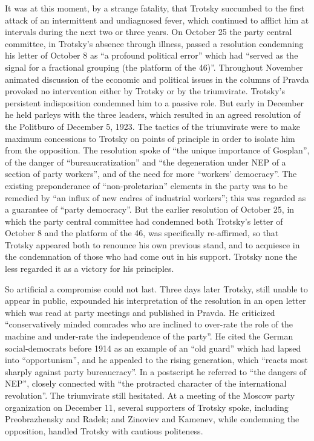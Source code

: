 It was at this moment, by a strange fatality, that Trotsky succumbed to the first attack of an intermittent and undiagnosed fever, which continued to afflict him at intervals during the next two or three years. On October 25 the party central committee, in Trotsky's absence through illness, passed a resolution condemning his letter of October 8 as ``a profound political error'' which had ``served as the signal for a fractional grouping (the platform of the 46)''. Throughout November animated discussion of the economic and political issues in the columns of Pravda provoked no intervention either by Trotsky or by the triumvirate. Trotsky's persistent indisposition condemned him to a passive role. But early in December he held parleys with the three leaders, which resulted in an agreed resolution of the Politburo of December 5, 1923. The tactics of the triumvirate were to make maximum concessions to Trotsky on points of principle in order to isolate him from the opposition. The resolution spoke of ``the unique importance of Gosplan'', of the danger of ``bureaucratization'' and ``the degeneration under NEP of a section of party workers'', and of the need for more ``workers' democracy''. The existing preponderance of ``non-proletarian'' elements in the party was to be remedied by ``an influx of new cadres of industrial workers''; this was regarded as a guarantee of ``party democracy''. But the earlier resolution of October 25, in which the party central committee had condemned both Trotsky's letter of October 8 and the platform of the 46, was specifically re-affirmed, so that Trotsky appeared both to renounce his own previous stand, and to acquiesce in the condemnation of those who had come out in his support. Trotsky none the less regarded it as a victory for his principles. 

So artificial a compromise could not last. Three days later Trotsky, still unable to appear in public, expounded his interpretation of the resolution in an open letter which was read at party meetings and published in Pravda. He criticized ``conservatively minded comrades who are inclined to over-rate the role of the machine and under-rate the independence of the party''. He cited the German social-democrats before 1914 as an example of an ``old guard'' which had lapsed into ``opportunism'', and he appealed to the rising generation, which ``reacts most sharply against party bureaucracy''. In a postscript he referred to ``the dangers of NEP'', closely connected with ``the protracted character of the international revolution''. The triumvirate still hesitated. At a meeting of the Moscow party organization on December 11, several supporters of Trotsky spoke, including Preobrazhensky and Radek; and Zinoviev and Kamenev, while condemning the opposition, handled Trotsky with cautious politeness. 

